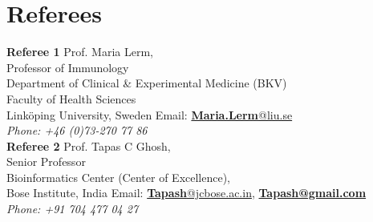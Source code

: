 \documentclass[]{friggeri-cv}
\begin{document}
\section{Referees}
\begin{entrylist}
	\entry
	{\textbf{Referee 1}}
	{Prof. Maria Lerm, \\Professor of Immunology\\Department of Clinical \& Experimental Medicine (BKV)\\Faculty of Health Sciences
		\\Linköping University, Sweden}
	{}
	{Email: \href{mailto: maria.lerm@liu.se}{\textbf{Maria.Lerm}@liu.se}\\
	\emph{Phone: +46 (0)73-270 77 86}}
\\
\entry
	{\textbf{Referee 2}}
	{Prof. Tapas C Ghosh, \\Senior Professor \\ Bioinformatics Center (Center of Excellence), \\Bose Institute, India}
	{}
	{Email: \href{mailto: tapash@jcbose.ac.in}{\textbf{Tapash}@jcbose.ac.in}, \href{mailto: tapashbic@gmail.com}{\textbf{Tapash@gmail.com}}\\
				\emph{Phone: +91 704 477 04 27}}
	\end{entrylist}


\end{document}
